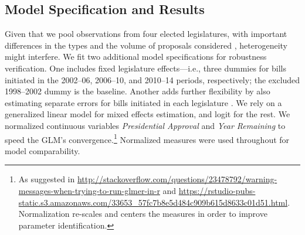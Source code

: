 \documentclass[letter,12pt]{article}
\begin{document}
\subsection*{Model Specification and Results}

Given that we pool observations from four elected legislatures, with important differences in the types and the volume of proposals considered \citep{aleman.navia.UrgChi.2009}, heterogeneity might interfere. We fit two additional model specifications for robustness verification. One includes fixed legislature effects---i.e., three dummies for bills initiated in the 2002--06, 2006--10, and 2010--14 periods, respectively; the excluded 1998--2002 dummy is the baseline. Another adds further flexibility by also estimating separate errors for bills initiated in each legislature \citep[a so-called mixed effects model,][, 262, 302]{gelman.hill.2007}. We rely on a generalized linear model for mixed effects estimation, and logit for the rest. We normalized continuous variables \emph{Presidential Approval} and \emph{Year Remaining} to speed the GLM's convergence.\footnote{As suggested in \url{http://stackoverflow.com/questions/23478792/warning-messages-when-trying-to-run-glmer-in-r} and \url{https://rstudio-pubs-static.s3.amazonaws.com/33653_57fc7b8e5d484c909b615d8633c01d51.html}. Normalization re-scales and centers the measures in order to improve parameter identification.} Normalized measures were used throughout for model comparability.
\end{document}
